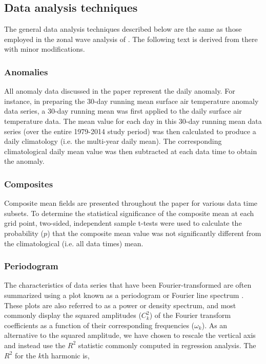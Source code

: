 \subsection{Data analysis techniques}

The general data analysis techniques described below are the same as those employed in the zonal wave analysis of \citet{IrvingSimmonds2015}. The following text is derived from there with minor modifications.

\subsubsection{Anomalies}
All anomaly data discussed in the paper represent the daily anomaly. For instance, in preparing the 30-day running mean surface air temperature anomaly data series, a 30-day running mean was first applied to the daily surface air temperature data. The mean value for each day in this 30-day running mean data series (over the entire 1979-2014 study period) was then calculated to produce a daily climatology (i.e. the multi-year daily mean). The corresponding climatological daily mean value was then subtracted at each data time to obtain the anomaly.  

\subsubsection{Composites}
Composite mean fields are presented throughout the paper for various data time subsets. To determine the statistical significance of the composite mean at each grid point, two-sided, independent sample t-tests were used to calculate the probability ($p$) that the composite mean value was not significantly different from the climatological (i.e. all data times) mean.

\subsubsection{Periodogram}

The characteristics of data series that have been Fourier-transformed are often summarized using a plot known as a periodogram or Fourier line spectrum \citep{Wilks2011}. These plots are also referred to as a power or density spectrum, and most commonly display the squared amplitudes ($C_k^2$) of the Fourier transform coefficients as a function of their corresponding frequencies ($\omega_k$). As an alternative to the squared amplitude, we have chosen to rescale the vertical axis and instead use the $R^2$ statistic commonly computed in regression analysis. The $R^2$ for the $k$th harmonic is,

